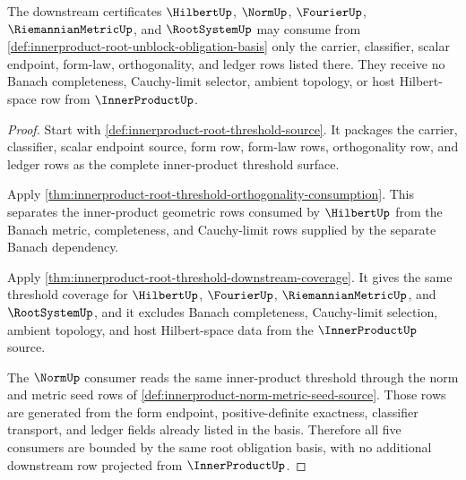 \begin{theorem}
\label{thm:innerproduct-root-unblock-downstream-threshold}
The downstream certificates $\HilbertUp$, $\NormUp$, $\FourierUp$,
$\RiemannianMetricUp$, and $\RootSystemUp$ may consume from
\autoref{def:innerproduct-root-unblock-obligation-basis} only the carrier,
classifier, scalar endpoint, form-law, orthogonality, and ledger rows listed
there. They receive no Banach completeness, Cauchy-limit selector, ambient
topology, or host Hilbert-space row from $\InnerProductUp$.
\end{theorem}
\begin{proof}
Start with \autoref{def:innerproduct-root-threshold-source}. It packages the
carrier, classifier, scalar endpoint source, form row, form-law rows,
orthogonality row, and ledger rows as the complete inner-product threshold
surface.

Apply \autoref{thm:innerproduct-root-threshold-orthogonality-consumption}.
This separates the inner-product geometric rows consumed by $\HilbertUp$
from the Banach metric, completeness, and Cauchy-limit rows supplied by the
separate Banach dependency.

Apply \autoref{thm:innerproduct-root-threshold-downstream-coverage}. It gives
the same threshold coverage for $\HilbertUp$, $\FourierUp$,
$\RiemannianMetricUp$, and $\RootSystemUp$, and it excludes Banach
completeness, Cauchy-limit selection, ambient topology, and host Hilbert-space
data from the $\InnerProductUp$ source.

The $\NormUp$ consumer reads the same inner-product threshold through the norm
and metric seed rows of \autoref{def:innerproduct-norm-metric-seed-source}.
Those rows are generated from the form endpoint, positive-definite
exactness, classifier transport, and ledger fields already listed in the
basis. Therefore all five consumers are bounded by the same root obligation
basis, with no additional downstream row projected from $\InnerProductUp$.
\end{proof}
